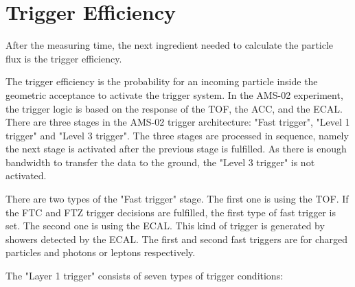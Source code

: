 
\section{Trigger Efficiency} \label{TriggerEfficiencySection}

After the measuring time, the next ingredient needed to calculate the particle flux is the trigger efficiency. \par

The trigger efficiency is the probability for an incoming particle inside the geometric acceptance to activate the trigger system. In the AMS-02 experiment, the trigger logic is based on the response of the TOF, the ACC, and the ECAL. There are three stages in the AMS-02 trigger architecture: "Fast trigger", "Level 1 trigger" and "Level 3 trigger". The three stages are processed in sequence, namely the next stage is activated after the previous stage is fulfilled. As there is enough bandwidth to transfer the data to the ground, the "Level 3 trigger" is not activated.  \par

There are two types of the "Fast trigger" \cite{ACCAsTrigger} stage. The first one is using the TOF. If the FTC and FTZ trigger decisions \cite{BastianPhDPaper} are fulfilled, the first type of fast trigger is set. The second one is using the ECAL. This kind of trigger is generated by showers detected by the ECAL. The first and second fast triggers are for charged particles and photons or leptons respectively. \par

The "Layer 1 trigger" consists of seven types of trigger conditions: \par

